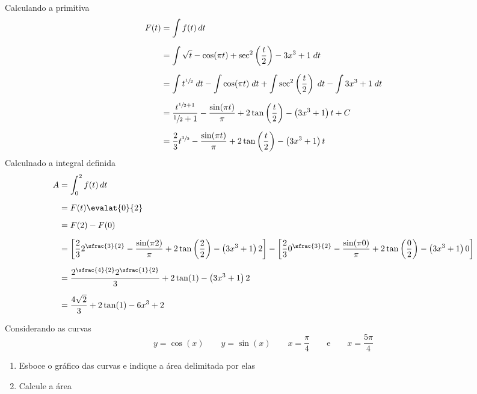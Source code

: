 \documentclass[a4paper,12pt,fleqn]{article}
\begin{document}
\begin{answer}
  Calculando a primitiva
  \begin{align*}
    F(t) & = \int f(t)\, dt \\[2mm]
         & = \int \sqrt{t}
           - \cos(\pi t)
           + \sec^2\left(\frac{t}{2}\right)
           - 3x^3 + 1 \;dt \\[2mm]
         & = \int t^{\sfrac{1}{2}} \;dt
           - \int \cos(\pi t) \;dt
           + \int \sec^2\left(\frac{t}{2}\right) \;dt
           - \int 3x^3 + 1 \;dt \\[2mm]
         & = \frac{t^{\sfrac{1}{2}+1}}{\sfrac{1}{2}+1}
           - \frac{\sin(\pi t)}{\pi}
           + 2\tan\left(\frac{t}{2}\right)
           - \left(3x^3 + 1\right)t
           + C \\[2mm]
         & = \frac{2}{3}t^{\sfrac{3}{2}}
           - \frac{\sin(\pi t)}{\pi}
           + 2\tan\left(\frac{t}{2}\right)
           - \left(3x^3 + 1\right)t
  \end{align*}
  Calculnado a integral definida
  \begin{align*}
    A & = \int_0^2 f(t)\, dt \\[2mm]
      & = F(t) \evalat{0}{2} \\[2mm]
      & = F(2) - F(0) \\[2mm]
      & = \left[
            \frac{2}{3}2^{\sfrac{3}{2}}
            - \frac{\sin(\pi 2)}{\pi}
            + 2\tan\left(\frac{2}{2}\right)
            - \left(3x^3 + 1\right)2
          \right]
       - \left[
            \frac{2}{3}0^{\sfrac{3}{2}}
            - \frac{\sin(\pi 0)}{\pi}
            + 2\tan\left(\frac{0}{2}\right)
            - \left(3x^3 + 1\right)0
        \right] \\[2mm]
        & = \frac{2^{\sfrac{4}{2}}2^{\sfrac{1}{2}}}{3}
          + 2\tan(1)
          - \left(3x^3 + 1\right)2 \\[2mm]
        & = \frac{4\sqrt{2}}{3} + 2\tan(1) - 6x^3 + 2
  \end{align*}
\end{answer}

Considerando as curvas
\[
  y = \cos(x)
  \qquad
  y = \sin(x)
  \qquad
  x = \frac{\pi}{4}
  \qquad\text{e}\qquad
  x = \frac{5\pi}{4}
\]
\begin{enumerate}[label=\alph*)]
  \item Esboce o gráfico das curvas e indique a área delimitada por elas
  \item Calcule a área
\end{enumerate}
\end{document}
